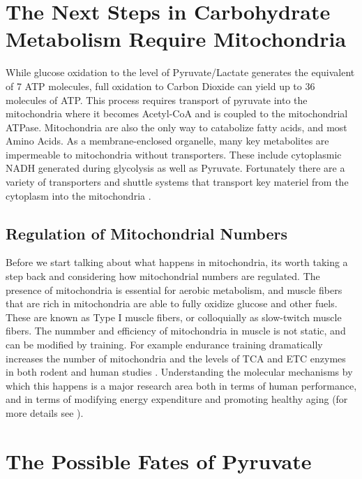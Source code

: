 \documentclass{tufte-handout}
\begin{document}
\section{The Next Steps in Carbohydrate Metabolism Require Mitochondria}
While glucose oxidation to the level of Pyruvate/Lactate generates the equivalent of 7 ATP molecules, full oxidation to Carbon Dioxide can yield up to 36 molecules of ATP.  This process requires transport of pyruvate into the mitochondria where it becomes Acetyl-CoA and is coupled to the mitochondrial ATPase.  Mitochondria are also the only way to catabolize fatty acids, and most Amino Acids.  As a membrane-enclosed organelle, many key metabolites are impermeable to mitochondria without transporters.  These include cytoplasmic NADH generated during glycolysis as well as Pyruvate.  Fortunately there are a variety of transporters and shuttle systems that transport key materiel from the cytoplasm into the mitochondria .

\subsection{Regulation of Mitochondrial Numbers}
Before we start talking about what happens in mitochondria, its worth taking a step back and considering how mitochondrial numbers are regulated.  The presence of mitochondria is essential for aerobic metabolism, and muscle fibers that are rich in mitochondria are able to fully oxidize glucose and other fuels.  These are known as Type I muscle fibers, or colloquially as slow-twitch muscle fibers.  The nummber and efficiency of mitochondria in muscle is not static, and can be modified by training.  For example endurance training dramatically increases the number of mitochondria and the levels of TCA and ETC enzymes in both rodent and human studies \citep{Holloszy1967,Gollnick1972,Gollnick1973}.  Understanding the molecular mechanisms by which this happens is a major research area both in terms of human performance, and in terms of modifying energy expenditure and promoting healthy aging (for more details see \citet{Cartee2016}). 

\section{The Possible Fates of Pyruvate}
\end{document}
